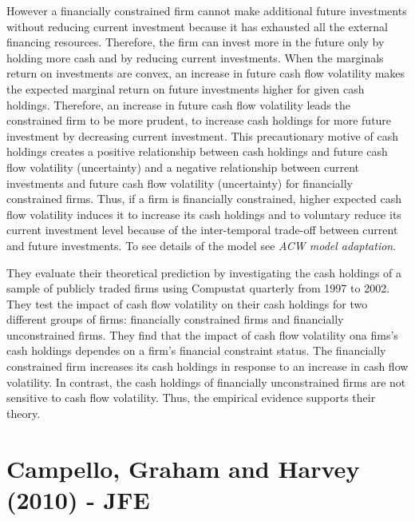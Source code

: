 \documentclass{article}
\begin{document}
{However a financially constrained firm cannot make additional future investments without reducing current investment because it has exhausted all the external financing resources. Therefore, the firm can invest more in the future only by holding more cash and by reducing current investments. When the marginals return on investments are convex, an increase in future cash flow volatility makes the expected marginal return on future investments higher for given cash holdings. Therefore, an increase in future cash flow volatility leads the constrained firm to be more prudent, to increase cash holdings for more future investment by decreasing current investment. This precautionary motive of cash holdings creates a positive relationship between cash holdings and future cash flow volatility (uncertainty) and a negative relationship between current investments and future cash flow volatility (uncertainty) for financially constrained firms. Thus, if a firm is financially constrained, higher expected cash flow volatility induces it to increase its cash holdings and to voluntary reduce its current investment level because of the inter-temporal trade-off between current and future investments. To see details of the model see \textit{ACW model adaptation}.

They evaluate their theoretical prediction by investigating the cash holdings of a sample of publicly traded firms using Compustat quarterly from 1997 to 2002. They test the impact of cash flow volatility on their cash holdings for two different groups of firms: financially constrained firms and financially unconstrained firms. They find that the impact of cash flow volatility ona  fims's cash holdings dependes on a firm's financial constraint status. The financially constrained firm increases its cash holdings in response to an increase in cash flow volatility. In contrast, the cash holdings of financially unconstrained firms are not sensitive to cash flow volatility. Thus, the empirical evidence supports their theory. 


\section{Campello, Graham and Harvey (2010) - JFE}

}
\end{document}
